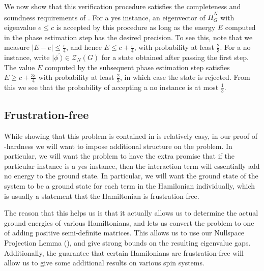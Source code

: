 \documentclass[../thesis-main/thesis-main]{subfiles}
\begin{document}
We now show that this verification procedure satisfies the completeness and soundness requirements of . For a yes instance, an eigenvector of $\bar{H}_{G}^{N}$ with eigenvalue $e\leq c$ is accepted by this procedure as long as the energy $E$ computed in the phase estimation step has the desired precision. To see this, note that we measure $\left|E-e\right|\leq\frac{\epsilon}{4}$, and hence $E\leq c+\frac{\epsilon}{4}$, with probability at least $\frac{2}{3}$.  For a no instance, write $|\phi^{\prime}\rangle\in\mathcal{Z}_{N}(G)$ for a state obtained after passing the first step. The value $E$ computed by the subsequent phase estimation step satisfies $E\geq c+\frac{3\epsilon}{4}$ with probability at least $\frac{2}{3}$, in which case the state is rejected. From this we see that the probability of accepting a no instance is at most $\frac{1}{3}$.



\subsection{Frustration-free}


While showing that this problem is contained in \QMA is relatively easy, in our proof of \QMA-hardness we will want to impose additional structure on the problem.  In particular, we will want the problem to have the extra promise that if the particular instance is a yes instance, then the interaction term will essentially add no energy to the ground state.  In particular, we will want the ground state of the system to be a ground state for each term in the Hamilonian individually, which is usually a statement that the Hamiltonian is frustration-free.

The reason that this helps us is that it actually allows us to determine the actual ground energies of various Hamiltonians, and lets us convert the problem to one of adding positive semi-definite matrices.  This allows us to use our Nullspace Projection Lemma (), and give strong bounds on the resulting eigenvalue gaps.  Additionally, the guarantee that certain Hamilonians are frustration-free will allow us to give some additional results on various spin systems.



\end{document}
